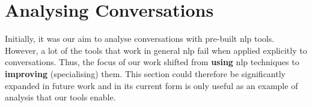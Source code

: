\chapter{Analysing Conversations}
Initially, it was our aim to analyse conversations with pre-built \gls{nlp} tools. However, a lot of the tools that work in general \gls{nlp} fail when applied explicitly to conversations. Thus, the focus of our work shifted from \textbf{using} \gls{nlp} techniques to \textbf{improving} (specialising) them. This section could therefore be significantly expanded in future work and in its current form is only useful as an example of analysis that our tools enable.



\glsresetall